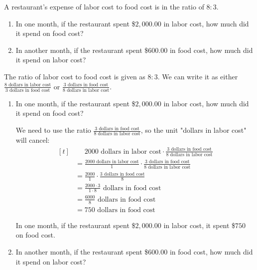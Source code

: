 \begin{myexample}
A restaurant's expense of labor cost to food cost is in the ratio of $8:3$.
\begin{enumerate}
\item In one month, if the restaurant spent \$$2,000.00$ in labor cost, how much did it spend on food cost?
\item In another month, if the restaurant spent \$$600.00$ in food cost, how much did it spend on labor cost?
\end{enumerate}
\end{myexample}
\begin{solution}

The ratio of labor cost to food cost is given as $8:3$. We can write it as either $\frac{8 \text{ dollars in labor cost}}{3 \text{ dollars in food cost}}$ or $\frac{3 \text{ dollars in food cost}}{8 \text{ dollars in labor cost}}$.

\begin{enumerate}
\item In one month, if the restaurant spent \$$2,000.00$ in labor cost, how much did it spend on food cost?

We need to use the ratio $\frac{3 \text{ dollars in food cost}}{8 \text{ dollars in labor cost}}$, so the unit "dollars in labor cost" will cancel:
\[
\begin{aligned}[t]
	&\phantom{{}=}2000 \text{ dollars in labor cost} \cdot \frac{3 \text{ dollars in food cost}}{8 \text{ dollars in labor cost}} \\
	&= \frac{2000 \text{ dollars in labor cost}}{1} \cdot \frac{3 \text{ dollars in food cost}}{8 \text{ dollars in labor cost}} \\
	&= \frac{2000}{1} \cdot \frac{3 \text{ dollars in food cost}}{8} \\
	&= \frac{2000\cdot3}{1\cdot8} \text{ dollars in food cost} \\
	&= \frac{6000}{8} \text{ dollars in food cost} \\
	&= 750 \text{ dollars in food cost}
\end{aligned}
\]

In one month, if the restaurant spent \$$2,000.00$ in labor cost, it spent \$$750$ on food cost.
\item In another month, if the restaurant spent \$$600.00$ in food cost, how much did it spend on labor cost?


\end{enumerate}
\end{solution}
